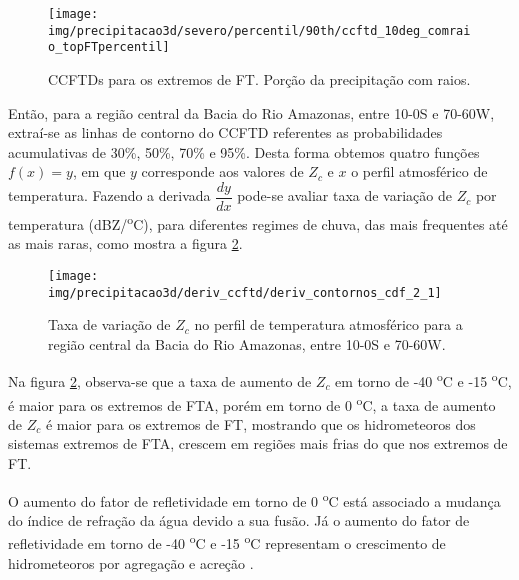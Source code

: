 \begin{figure}
  \texttt{[image: img/precipitacao3d/severo/percentil/90th/ccftd\_10deg\_comraio\_topFTpercentil]}
  \caption{CCFTDs para os extremos de FT. Porção da precipitação com raios.}
  \label{ccftd_ft_com}   
\end{figure} 

Então, para a região central da Bacia do Rio Amazonas, entre 10-0S e 70-60W, extraí-se as linhas de contorno do CCFTD referentes as probabilidades acumulativas de 30\%, 50\%, 70\% e 95\%. Desta forma obtemos quatro funções $f(x)=y$,  em que $y$ corresponde aos valores de $Z_c$ e $x$ o perfil atmosférico de temperatura. Fazendo a derivada $\dfrac{dy}{dx}$ pode-se avaliar taxa de variação de $Z_c$ por temperatura (dBZ/\textsuperscript{o}C), para diferentes regimes de chuva, das mais frequentes até as mais raras, como mostra a figura \ref{deriv_amazonas}.

\begin{figure}[!ht]
  \centering
  \texttt{[image: img/precipitacao3d/deriv\_ccftd/deriv\_contornos\_cdf\_2\_1]}
  \caption{Taxa de variação de $Z_c$ no perfil de temperatura atmosférico para a região central da Bacia do Rio Amazonas, entre 10-0S e 70-60W.}
  \label{deriv_amazonas}  
\end{figure} 


Na figura \ref{deriv_amazonas}, observa-se que a taxa de aumento de $Z_c$ em torno de -40 \textsuperscript{o}C e -15 \textsuperscript{o}C, é maior para os extremos de FTA, porém em torno de 0 \textsuperscript{o}C, a taxa de aumento de $Z_c$ é maior para os extremos de FT, mostrando que os hidrometeoros dos sistemas extremos de FTA, crescem em regiões mais frias do que nos extremos de FT.


O aumento do fator de refletividade em torno de 0 \textsuperscript{o}C está associado a mudança do índice de refração da água devido a sua fusão. Já o aumento do fator de refletividade em torno de -40 \textsuperscript{o}C e -15 \textsuperscript{o}C representam o crescimento de hidrometeoros por agregação e acreção \cite{Fabry1995,Takahashi1978}.

